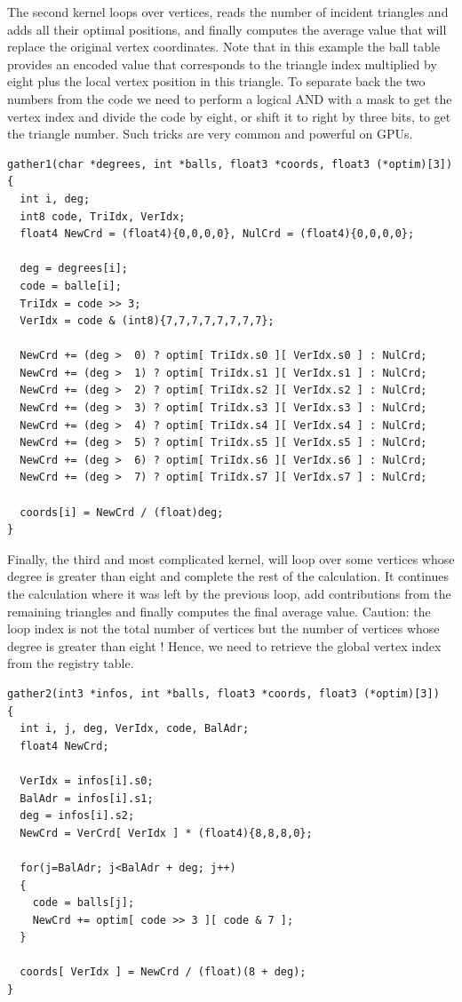 \documentclass[a4paper,12pt]{article}
\begin{document}
The second kernel loops over vertices, reads the number of incident triangles and adds all their optimal positions, and finally computes the average value that will replace the original vertex coordinates. Note that in this example the ball table provides an encoded value that corresponds to the triangle index multiplied by eight plus the local vertex position in this triangle. To separate back the two numbers from the code we need to perform a logical AND with a mask to get the vertex index and divide the code by eight, or shift it to right by three bits, to get the triangle number. Such tricks are very common and powerful on GPUs.

\begin{tt}
\begin{verbatim}
gather1(char *degrees, int *balls, float3 *coords, float3 (*optim)[3])
{
  int i, deg;
  int8 code, TriIdx, VerIdx;
  float4 NewCrd = (float4){0,0,0,0}, NulCrd = (float4){0,0,0,0};

  deg = degrees[i];
  code = balle[i];
  TriIdx = code >> 3;
  VerIdx = code & (int8){7,7,7,7,7,7,7,7};

  NewCrd += (deg >  0) ? optim[ TriIdx.s0 ][ VerIdx.s0 ] : NulCrd;
  NewCrd += (deg >  1) ? optim[ TriIdx.s1 ][ VerIdx.s1 ] : NulCrd;
  NewCrd += (deg >  2) ? optim[ TriIdx.s2 ][ VerIdx.s2 ] : NulCrd;
  NewCrd += (deg >  3) ? optim[ TriIdx.s3 ][ VerIdx.s3 ] : NulCrd;
  NewCrd += (deg >  4) ? optim[ TriIdx.s4 ][ VerIdx.s4 ] : NulCrd;
  NewCrd += (deg >  5) ? optim[ TriIdx.s5 ][ VerIdx.s5 ] : NulCrd;
  NewCrd += (deg >  6) ? optim[ TriIdx.s6 ][ VerIdx.s6 ] : NulCrd;
  NewCrd += (deg >  7) ? optim[ TriIdx.s7 ][ VerIdx.s7 ] : NulCrd;

  coords[i] = NewCrd / (float)deg;
}
\end{verbatim}
\end{tt}
\normalfont

Finally, the third and most complicated kernel, will loop over some vertices whose degree is greater than eight and complete the rest of the calculation. It continues the calculation where it was left by the previous loop, add contributions from the remaining triangles and finally computes the final average value. Caution: the loop index is not the total number of vertices but the number of vertices whose degree is greater than eight ! Hence, we need to retrieve the global vertex index from the registry table.

\begin{tt}
\begin{verbatim}
gather2(int3 *infos, int *balls, float3 *coords, float3 (*optim)[3])
{
  int i, j, deg, VerIdx, code, BalAdr;
  float4 NewCrd;

  VerIdx = infos[i].s0;
  BalAdr = infos[i].s1;
  deg = infos[i].s2;
  NewCrd = VerCrd[ VerIdx ] * (float4){8,8,8,0};

  for(j=BalAdr; j<BalAdr + deg; j++)
  {
    code = balls[j];
    NewCrd += optim[ code >> 3 ][ code & 7 ];
  }

  coords[ VerIdx ] = NewCrd / (float)(8 + deg);
}
\end{verbatim}
\end{tt}
\normalfont
\end{document}
